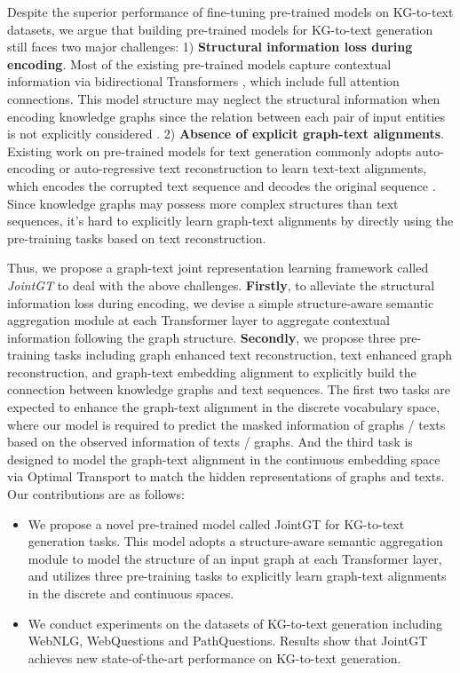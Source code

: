 \documentclass[11pt,a4paper]{article}
\begin{document}
Despite the superior performance of fine-tuning pre-trained models on KG-to-text datasets, we argue that building 
pre-trained models for KG-to-text generation still faces two major challenges: 1) \textbf{Structural information loss during encoding}. Most of the existing pre-trained models capture contextual information via bidirectional Transformers \cite{devlin2019bert}, which include full attention connections. This model structure may neglect the structural information when encoding knowledge graphs since the relation between each pair of input entities is not explicitly considered \cite{zhu2019structaware}.
2) \textbf{Absence of explicit graph-text alignments}. Existing work on pre-trained models for text generation commonly adopts auto-encoding or auto-regressive text reconstruction to learn text-text alignments, which encodes the corrupted text sequence and decodes the original sequence \cite{lewis2020bart,raffel2020t5}.
Since knowledge graphs may possess more complex structures than text sequences, it's hard to explicitly learn graph-text alignments by directly using the pre-training tasks based on text reconstruction.



Thus, we propose a graph-text joint representation learning framework called \textit{JointGT} to deal with the above challenges. 
\textbf{Firstly}, to alleviate the structural information loss during encoding, we devise a simple structure-aware semantic aggregation module at each Transformer layer to aggregate contextual information following the graph structure.
\textbf{Secondly}, we propose three pre-training tasks including graph enhanced text reconstruction, text enhanced graph reconstruction, and graph-text embedding alignment to explicitly build the connection between knowledge graphs and text sequences. The first two tasks are expected to enhance the graph-text alignment in the discrete vocabulary space, where our model is required to predict the masked information of graphs / texts based on the observed information of texts / graphs.
And the third task is designed to model the graph-text alignment in the continuous embedding space via Optimal Transport \cite{peyre2019ot} to match the hidden representations of graphs and texts. Our contributions are as follows:
\begin{itemize}
    \item We propose a novel pre-trained model called JointGT for KG-to-text generation tasks. This model adopts a structure-aware semantic aggregation module to model the structure of an input graph at each Transformer layer, and utilizes three pre-training tasks to explicitly learn graph-text alignments in the discrete and continuous spaces.
    \item We conduct experiments on the datasets of KG-to-text generation including WebNLG, WebQuestions and PathQuestions. Results show that JointGT achieves new state-of-the-art performance on KG-to-text generation.
\end{itemize}
\end{document}
